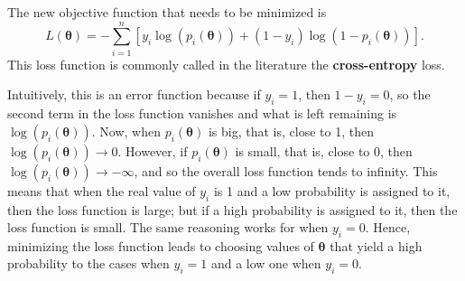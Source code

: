 The new objective function that needs to be minimized is
\begin{equation}
  \label{eq:logistic_example_loss_function}
  L(\boldsymbol{\theta}) = - \sum_{i = 1}^n \left[ y_i \log\left( p_i(\boldsymbol{\theta}) \right) + (1 - y_i) \log \left( 1 - p_i(\boldsymbol{\theta}) \right) \right].
\end{equation}
This loss function is commonly called in the literature the \textbf{cross-entropy} loss.

Intuitively, this is an error function because if $y_i = 1$, then $1 - y_i = 0$, so the second term in the loss function vanishes and what is left remaining is $\log\left( p_i(\boldsymbol{\theta}) \right)$. Now, when $p_i(\boldsymbol{\theta})$ is big, that is, close to 1, then $\log\left( p_i(\boldsymbol{\theta}) \right) \to 0$. However, if $p_i(\boldsymbol{\theta})$ is small, that is, close to 0, then $\log\left( p_i(\boldsymbol{\theta}) \right) \to -\infty$, and so the overall loss function tends to infinity. This means that when the real value of $y_i$ is 1 and a low probability is assigned to it, then the loss function is large; but if a high probability is assigned to it, then the loss function is small. The same reasoning works for when $y_i = 0$.
Hence, minimizing the loss function leads to choosing values of $\boldsymbol{\theta}$ that yield a high probability to the cases when $y_i = 1$ and a low one when $y_i = 0$.


